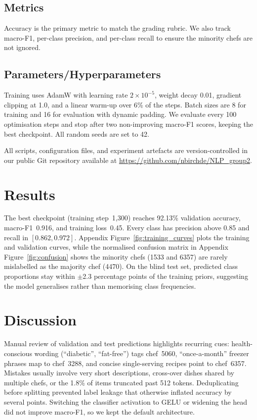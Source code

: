 \documentclass[twocolumn,10pt]{article}
\begin{document}
\subsection{Metrics}
Accuracy is the primary metric to match the grading rubric. We also track macro-F1, per-class precision, and per-class recall to ensure the minority chefs are not ignored.

\subsection{Parameters/Hyperparameters}
Training uses AdamW with learning rate $2\times10^{-5}$, weight decay 0.01, gradient clipping at 1.0, and a linear warm-up over 6\% of the steps. Batch sizes are 8 for training and 16 for evaluation with dynamic padding. We evaluate every 100 optimisation steps and stop after two non-improving macro-F1 scores, keeping the best checkpoint. All random seeds are set to 42.

All scripts, configuration files, and experiment artefacts are version-controlled in our public Git repository available at \url{https://github.com/nbirchde/NLP_group2}.

\section{Results}
\label{sec:results}
The best checkpoint (training step~1{,}300) reaches 92.13\% validation accuracy, macro-F1~0.916, and training loss~0.45. Every class has precision above 0.85 and recall in $[0.862, 0.972]$. Appendix Figure~\ref{fig:training_curves} plots the training and validation curves, while the normalised confusion matrix in Appendix Figure~\ref{fig:confusion} shows the minority chefs (1533 and 6357) are rarely mislabelled as the majority chef (4470). On the blind test set, predicted class proportions stay within $\pm$2.3 percentage points of the training priors, suggesting the model generalises rather than memorising class frequencies.

\section{Discussion}
Manual review of validation and test predictions highlights recurring cues: health-conscious wording (``diabetic'', ``fat-free'') tags chef~5060, ``once-a-month'' freezer phrases map to chef~3288, and concise single-serving recipes point to chef~6357. Mistakes usually involve very short descriptions, cross-over dishes shared by multiple chefs, or the 1.8\% of items truncated past 512 tokens. Deduplicating before splitting prevented label leakage that otherwise inflated accuracy by several points. Switching the classifier activation to GELU or widening the head did not improve macro-F1, so we kept the default architecture.
\end{document}
